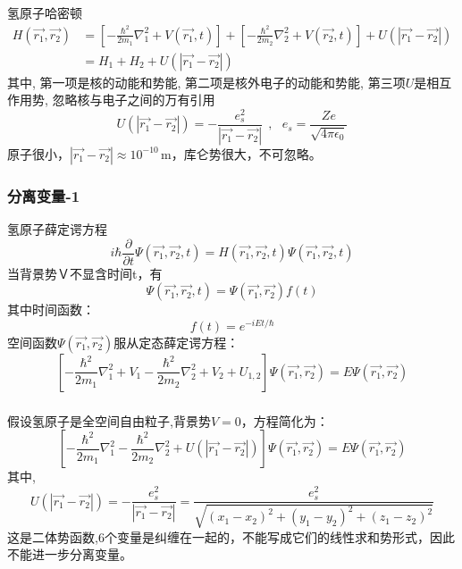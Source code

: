 \begin{frame}
\frametitle{}
氢原子哈密顿
\begin{equation*}
  \begin{aligned}
    H (\vec{r_1},\vec{r_2})&=\left[-\frac{\hbar^2}{2 m_1} \nabla_1 ^2 + V(\vec{r_1},t) \right]  + \left[-\frac{\hbar^2}{2 m_2} \nabla_2 ^2 + V(\vec{r_2},t) \right]  +U(| \vec{r_1}-\vec{r_2} | ) \\ 
    &= H_1 + H_2 + U(| \vec{r_1}-\vec{r_2} | )
  \end{aligned}
\end{equation*}
其中, 第一项是核的动能和势能, 第二项是核外电子的动能和势能, 第三项$U$是相互作用势, 忽略核与电子之间的万有引用
\begin{equation*}
  U(| \vec{r_1}-\vec{r_2} | )=-\frac{e_s ^2}{| \vec{r_1}-\vec{r_2} |} ~~,~~~ e_s =\frac{Ze}{\sqrt{4\pi\epsilon_0}}
\end{equation*}
原子很小，$|\vec{r_1}-\vec{r_2}| \approx 10^{-10}\, \text{m}$，库仑势很大，不可忽略。
\end{frame}

\begin{frame}
\frametitle{分离变量-1}
氢原子薛定谔方程
\begin{equation*}
  i\hbar \frac{\partial }{\partial t} \Psi (\vec{r_1},\vec{r_2},t ) =H (\vec{r_1},\vec{r_2}, t  )  \Psi (\vec{r_1},\vec{r_2},t ) 
\end{equation*}
当背景势Ｖ不显含时间t，有$$ \Psi (\vec{r_1},\vec{r_2},t ) = \Psi (\vec{r_1},\vec{r_2})f(t) $$其中时间函数：
\begin{equation*}
  f(t) =e^{-iEt/\hbar}
\end{equation*}
空间函数$ \Psi (\vec{r_1},\vec{r_2})$服从定态薛定谔方程：
\begin{equation*}
  \left[-\frac{\hbar^2}{2 m_1} \nabla_1 ^2 + V_1  -\frac{\hbar^2}{2 m_2} \nabla_2 ^2 + V_2  +U_{1,2} \right] \Psi (\vec{r_1},\vec{r_2}) =E \Psi (\vec{r_1},\vec{r_2}) 
\end{equation*}
\end{frame}		

\begin{frame}
\frametitle{}
假设氢原子是全空间自由粒子,背景势$V=0$，方程简化为：
\begin{equation*}
  \left[-\frac{\hbar^2}{2 m_1} \nabla_1 ^2  -\frac{\hbar^2}{2 m_2} \nabla_2 ^2 +U(| \vec{r_1}-\vec{r_2} | ) \right] \Psi (\vec{r_1},\vec{r_2}) =E \Psi (\vec{r_1},\vec{r_2}) 
\end{equation*}
其中, 
\begin{equation*}
  U(| \vec{r_1}-\vec{r_2} | )=-\frac{e_s ^2}{| \vec{r_1}-\vec{r_2} |} = \frac{e_s ^2}{\sqrt{(x_1 -x_2)^2 + (y_1 -y_2)^2 + (z_1 -z_2)^2} } 
\end{equation*}
这是二体势函数,6个变量是纠缠在一起的，不能写成它们的线性求和势形式，因此不能进一步分离变量。
\end{frame}		

